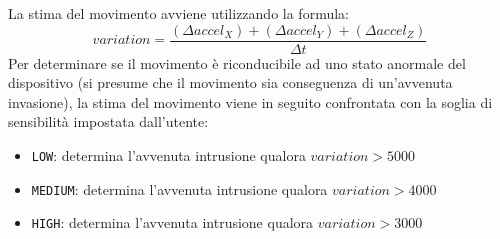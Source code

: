 La stima del movimento avviene utilizzando la formula:
\[variation = \frac{(\Delta accel_X) + (\Delta accel_Y) + (\Delta accel_Z)}{\Delta t}\]
Per determinare se il movimento è riconducibile ad uno stato anormale del dispositivo (si presume che il movimento sia conseguenza di un'avvenuta invasione), la stima del movimento viene in seguito confrontata con la soglia di sensibilità impostata dall'utente:
\begin{itemize}
  \item \texttt{LOW}: determina l'avvenuta intrusione qualora $variation >  5000$
  \item \texttt{MEDIUM}: determina l'avvenuta intrusione qualora $variation > 4000$
  \item \texttt{HIGH}: determina l'avvenuta intrusione qualora $variation > 3000$
\end{itemize}~\\

